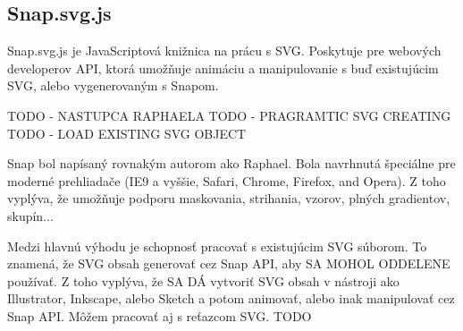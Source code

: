 


\subsection{Snap.svg.js}

Snap.svg.js je JavaScriptová knižnica na prácu s SVG. Poskytuje pre webových developerov \acs{API}, ktorá umožňuje animáciu a manipulovanie s buď existujúcim SVG, alebo vygenerovaným s Snapom. 

TODO - NASTUPCA RAPHAELA
TODO - PRAGRAMTIC SVG CREATING 
TODO - LOAD EXISTING SVG OBJECT


Snap bol napísaný rovnakým autorom ako Raphael.  Bola navrhnutá špeciálne pre moderné prehliadače (IE9 a vyššie, Safari, Chrome, Firefox, and Opera). Z toho vyplýva, že umožňuje podporu maskovania, strihania, vzorov, plných gradientov, skupín... 



Medzi hlavnú výhodu je schopnosť pracovať s existujúcim SVG súborom. To znamená, že  SVG obsah generovať cez Snap API, aby SA MOHOL ODDELENE používať. Z toho vyplýva, že SA DÁ vytvoriť SVG obsah v nástroji ako Illustrator, Inkscape, alebo Sketch a potom animovať, alebo inak manipulovať cez Snap API. Môžem pracovať aj s reťazcom SVG. TODO 

